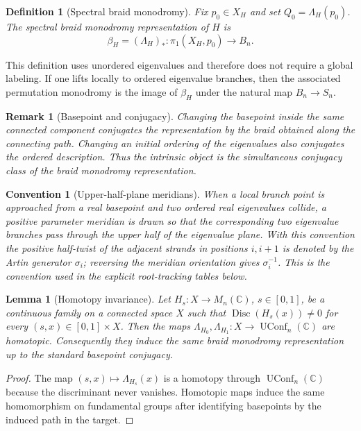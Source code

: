 \documentclass[11pt]{article}
\newtheorem{lemma}[theorem]{Lemma}
\newtheorem{definition}[theorem]{Definition}
\newtheorem{remark}[theorem]{Remark}
\newtheorem{convention}[theorem]{Convention}
\numberwithin{equation}{section}
\DeclareMathOperator{\UConf}{UConf}
\DeclareMathOperator{\Disc}{Disc}
\newcommand{\bbC}{\mathbb C}
\begin{document}
\begin{definition}[Spectral braid monodromy]
Fix $p_0\in X_H$ and set $Q_0=\Lambda_H(p_0)$.  The spectral braid
monodromy representation of $H$ is
\[
  \beta_H=(\Lambda_H)_*:\pi_1(X_H,p_0)\longrightarrow B_n.
\]
\end{definition}

This definition uses unordered eigenvalues and therefore does not require a
global labeling.  If one lifts locally to ordered eigenvalue branches, then
the associated permutation monodromy is the image of $\beta_H$ under the
natural map $B_n\to S_n$.

\begin{remark}[Basepoint and conjugacy]
Changing the basepoint inside the same connected component conjugates the
representation by the braid obtained along the connecting path.  Changing an
initial ordering of the eigenvalues also conjugates the ordered description.
Thus the intrinsic object is the simultaneous conjugacy class of the braid
monodromy representation.

\end{remark}

\begin{convention}[Upper-half-plane meridians]\label{conv:upper-half-plane}
When a local branch point is approached from a real basepoint and two
ordered real eigenvalues collide, a positive parameter meridian is drawn so
that the corresponding two eigenvalue branches pass through the upper half
of the eigenvalue plane.  With this convention the positive half-twist of
the adjacent strands in positions \(i,i+1\) is denoted by the Artin generator
\(\sigma_i\); reversing the meridian orientation gives \(\sigma_i^{-1}\).
This is the convention used in the explicit root-tracking tables below.
\end{convention}

\begin{lemma}[Homotopy invariance]
Let $H_s:X\to M_n(\bbC)$, $s\in[0,1]$, be a continuous family on a connected
space $X$ such that $\Disc(H_s(x))\ne0$ for every $(s,x)\in[0,1]\times X$.
Then the maps $\Lambda_{H_0},\Lambda_{H_1}:X\to\UConf_n(\bbC)$ are homotopic.
Consequently they induce the same braid monodromy representation up to the
standard basepoint conjugacy.
\end{lemma}

\begin{proof}
The map $(s,x)\mapsto\Lambda_{H_s}(x)$ is a homotopy through
$\UConf_n(\bbC)$ because the discriminant never vanishes.  Homotopic maps
induce the same homomorphism on fundamental groups after identifying
basepoints by the induced path in the target.
\end{proof}
\end{document}
